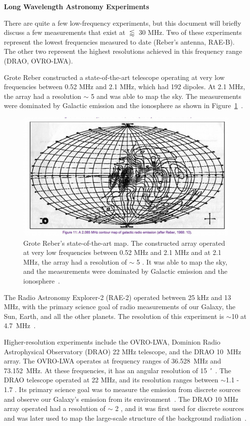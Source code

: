 {\bf{Long Wavelength Astronomy Experiments}}

There are quite a few low-frequency experiments, but this document will briefly discuss a few measurements that exist at $\lessapprox$ 30 MHz. Two of these experiments represent the lowest frequencies measured to date (Reber's antenna, RAE-B). The other two represent the highest resolutions achieved in this frequency range (DRAO, OVRO-LWA).

Grote Reber constructed a state-of-the-art telescope operating at very low frequencies between 0.52 MHz and 2.1 MHz, which had 192 dipoles. At 2.1 MHz, the array had a resolution $\sim$ 5 \degree and was able to map the sky. The measurements were dominated by Galactic emission and the ionosphere as shown in Figure~\ref{Fig:Rebermap}~\citep{1988JRASC..82...93R}. 

\begin{figure}
	\centering
	\includegraphics[width=0.7\linewidth]{Figures/Rebermap}
	\caption{Grote Reber's state-of-the-art map. The constructed array operated at very low frequencies between 0.52 MHz and 2.1 MHz and at 2.1 MHz, the array had a resolution of $\sim$ 5 \degree. It was able to map the sky, and the measurements were dominated by Galactic emission and the ionosphere~\citep{1988JRASC..82...93R}.}
	\label{Fig:Rebermap}
\end{figure}

The Radio Astronomy Explorer-2 (RAE-2) operated between 25 kHz and 13 MHz, with the primary science goal of radio measurements of our Galaxy, the Sun, Earth, and all the other planets. The resolution of this experiment is $\sim$10 \degree at \SI{4.7}{\mega\hertz}~\citep{1975A&A....40..365A}.

Higher-resolution experiments include the OVRO-LWA, Dominion Radio Astrophysical Observatory (DRAO) 22 MHz telescope, and the DRAO \SI{10}{\mega\hertz} array. The OVRO-LWA operates at frequency ranges of \SI{36.528}{\mega\hertz} and \SI{73.152}{\mega\hertz}. At these frequencies, it has an angular resolution of \SI{15}{\arcminute}~\citep{2018AJ....156...32E}. The DRAO telescope operated at 22 MHz, and its resolution ranges between $\sim$1.1 \degree - 1.7 \degree. Its primary science goal was to measure the emission from discrete sources and observe our Galaxy's emission from its environment~\citep{1999A&AS..137....7R}. The DRAO 10 MHz array operated had a resolution of $\sim$ 2  \degree, and it was first used for discrete sources and was later used to map the large-scale structure of the background radiation~\citep{1976MNRAS.177..601C}.

